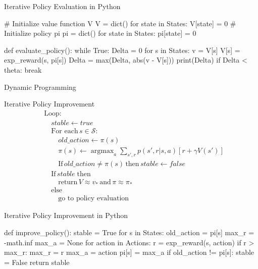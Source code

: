 \documentclass[ignorenonframetext,xcolor=x11names]{beamer}
\begin{document}
\begin{frame}[fragile]{Iterative Policy Evaluation in Python}
\begin{pythoncode}
# Initialize value function V
V = dict()
for state in States:
    V[state] = 0
# Initialize policy pi
pi = dict()
for state in States:
    pi[state] = 0

def evaluate_policy():
    while True:
        Delta = 0
        for s in States:
            v = V[s]
            V[s] = exp_reward(s, pi[s])
            Delta = max(Delta, abs(v - V[s]))
        print(Delta)
        if Delta < theta:
            break
\end{pythoncode}
\end{frame}

\begin{frame}{Dynamic Programming}
\begin{block}{Iterative Policy Improvement}
\begin{align*}
&\text{Loop:} \\
&\quad stable \leftarrow true \\
&\quad \text{For each}\, s \in \mathcal{S}: \\
&\quad \quad old\_action \leftarrow \pi(s) \\
&\quad \quad \pi (s) \leftarrow \operatorname*{argmax}\nolimits_a \sum\nolimits_{s', r} p(s', r|s, a) [r + \gamma V(s')] \\
&\quad \quad \text{If}\, old\_action \neq \pi(s) \, \text{then} \, stable \leftarrow false \\
&\quad \text{If}\, stable \; \text{then} \\
&\quad \quad \text{return}\, V \approx v_*\, \text{and} \, \pi \approx \pi_* \\
&\quad \text{else} \\
&\quad \quad \text{go to policy evaluation}
\end{align*}
\end{block}
\end{frame}

\begin{frame}[fragile]{Iterative Policy Improvement in Python}
\begin{pythoncode}
def improve_policy():
    stable = True
    for s in States:
        old_action = pi[s]
        max_r = -math.inf
        max_a = None
        for action in Actions:
            r = exp_reward(s, action)
            if r > max_r:
                max_r = r
                max_a = action
        pi[s] = max_a
        if old_action != pi[s]:
            stable = False
    return stable
\end{pythoncode}
\end{frame}
\end{document}
